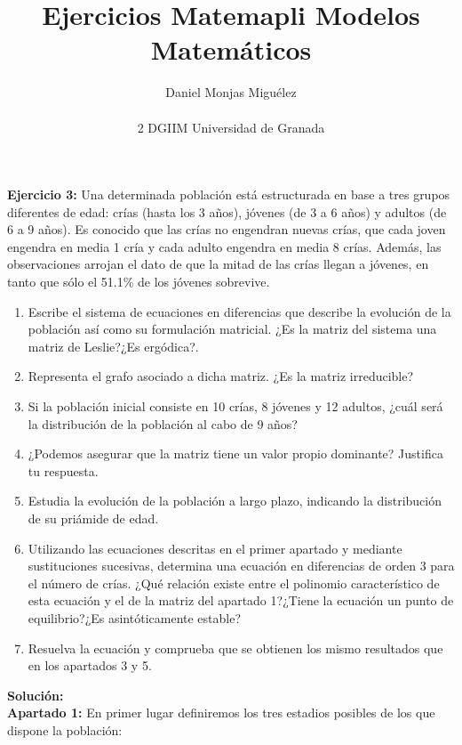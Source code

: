 \documentclass{article}
\author{Daniel Monjas Migu\'elez 
 		\\ \\ 2 DGIIM Universidad de Granada}
\title{Ejercicios Matemapli Modelos Matem\'aticos}
\begin{document}
\maketitle

\newpage



\textbf{Ejercicio 3:} Una determinada población está estructurada en base a tres grupos diferentes de edad: crías (hasta los 3 años), jóvenes (de 3 a 6 años) y adultos (de 6 a 9 años). Es conocido que las crías no engendran nuevas crías, que cada joven engendra en media 1 cría y cada adulto engendra en media 8 crías. Además, las observaciones arrojan el dato de que la mitad de las crías llegan a jóvenes, en tanto que sólo el 51.1\% de los jóvenes sobrevive.

\begin{enumerate}
\item Escribe el sistema de ecuaciones en diferencias que describe la evolución de la población así como su formulación matricial. ¿Es la matriz del sistema una matriz de Leslie?¿Es ergódica?.

\item Representa el grafo asociado a dicha matriz. ¿Es la matriz irreducible?

\item Si la población inicial consiste en 10 crías, 8 jóvenes y 12 adultos, ¿cuál será la distribución de la población al cabo de 9 años?

\item ¿Podemos asegurar que la matriz tiene un valor propio dominante? Justifica tu respuesta.

\item Estudia la evolución de la población a largo plazo, indicando la distribución de su priámide de edad.

\item Utilizando las ecuaciones descritas en el primer apartado y mediante sustituciones sucesivas, determina una ecuación en diferencias de orden 3 para el número de crías. ¿Qué relación existe entre el polinomio característico de esta ecuación y el de la matriz del apartado 1?¿Tiene la ecuación un punto de equilibrio?¿Es asintóticamente estable?

\item Resuelva la ecuación y comprueba que se obtienen los mismo resultados que en los apartados 3 y 5.
\end{enumerate}

\textbf{Solución:} \\
\textbf{Apartado 1:}
En primer lugar definiremos los tres estadios posibles de los que dispone la población:
\end{document}

